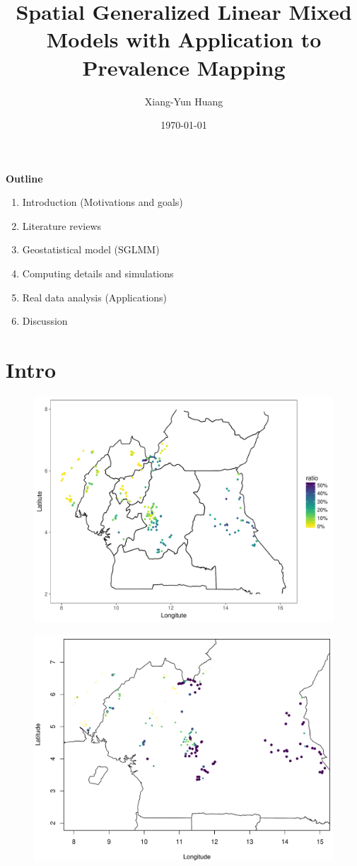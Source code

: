 \documentclass{beamer}
\author{Xiang-Yun Huang} %
\title[Spatial Generalized Linear Mixed Models]{Spatial Generalized Linear Mixed Models with Application to Prevalence Mapping}
\date{\today}
\begin{document}
\titlepageframe

\begin{tframe}

\textbf{Outline}
\begin{enumerate}
  \item Introduction (Motivations and goals)
  \item Literature reviews  
  \item Geostatistical model (SGLMM)
  \item Computing details and simulations
  \item Real data analysis (Applications)
  \item Discussion
\end{enumerate}
\end{tframe}

\section{Intro}

\begin{tframe}
\begin{figure}
\centering
\includegraphics[width=.8\textwidth]{demo01}
\end{figure}
\end{tframe}

\begin{tframe}
\begin{figure}
\centering
\includegraphics[width=.8\textwidth]{demo010}
\end{figure}
\end{tframe}
\end{document}
